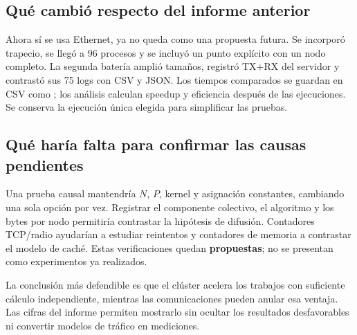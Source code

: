 \subsection{Qué cambió respecto del informe anterior}
Ahora sí se usa Ethernet, ya no queda como una propuesta futura. Se incorporó trapecio, se llegó a 96 procesos y se incluyó un punto explícito con un nodo completo. La segunda batería amplió tamaños, registró TX+RX del servidor y contrastó sus 75 logs con CSV y JSON. Los tiempos comparados se guardan en CSV como ; los análisis calculan speedup y eficiencia después de las ejecuciones. Se conserva la ejecución única elegida para simplificar las pruebas.

\subsection{Qué haría falta para confirmar las causas pendientes}
Una prueba causal mantendría $N$, $P$, kernel y asignación constantes, cambiando una sola opción por vez. Registrar el componente colectivo, el algoritmo y los bytes por nodo permitiría contrastar la hipótesis de difusión. Contadores TCP/radio ayudarían a estudiar reintentos y contadores de memoria a contrastar el modelo de caché. Estas verificaciones quedan \textbf{propuestas}; no se presentan como experimentos ya realizados.

\begin{idea}
La conclusión más defendible es que el clúster acelera los trabajos con suficiente cálculo independiente, mientras las comunicaciones pueden anular esa ventaja. Las cifras del informe permiten mostrarlo sin ocultar los resultados desfavorables ni convertir modelos de tráfico en mediciones.
\end{idea}
